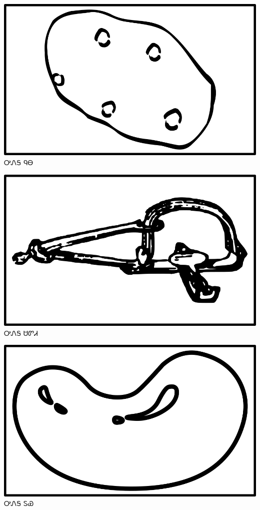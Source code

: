 \documentclass[avery5371]{flashcards}%
\begin{document}
    \begin{flashcard}{
        \includegraphics[width=0.95\columnwidth,height=.51\columnwidth,keepaspectratio]{../artwork/objects-neutral/nuna}
    }
        \Huge ᎤᏁᎦ ᏄᎾ
    \end{flashcard}

    \begin{flashcard}{
        \includegraphics[width=0.95\columnwidth,height=.51\columnwidth,keepaspectratio]{../artwork/objects-neutral/sadvdi}
    }
        \Huge ᎤᏁᎦ ᏌᏛᏗ
    \end{flashcard}

    \begin{flashcard}{
        \includegraphics[width=0.95\columnwidth,height=.51\columnwidth,keepaspectratio]{../artwork/objects-neutral/tuya}
    }
        \Huge ᎤᏁᎦ ᏚᏯ
    \end{flashcard}
\end{document}
